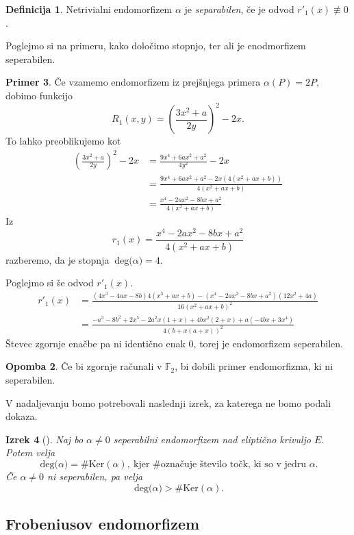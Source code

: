 \documentclass[12pt,a4paper,twoside]{article}
\theoremstyle{definition} %
\newtheorem{definicija}{Definicija}[section]
\newtheorem{primer}[definicija]{Primer}
\newtheorem{opomba}[definicija]{Opomba}
\theoremstyle{plain} %
\newtheorem{izrek}[definicija]{Izrek}
\numberwithin{equation}{section}  %
\newcommand{\F}{\mathbb F}
\newcommand{\DEG}[1]{\ \text{deg(}{#1}\text{)}}
\begin{document}
\begin{definicija}
Netrivialni endomorfizem $\alpha$ je \emph{separabilen}, če je odvod $r'_1(x) \not \equiv 0$.
\end{definicija}

Poglejmo si na primeru, kako določimo stopnjo, ter ali je enodmorfizem seperabilen.

\begin{primer}
Če vzamemo endomorfizem iz prejšnjega primera $\alpha(P) = 2P,$ dobimo funkcijo
$$R_1(x,y) = \left(\frac{3x^2+a}{2y}\right)^2-2x.$$
To lahko preoblikujemo kot
\begin{align}
\left(\frac{3x^2+a}{2y}\right)^2-2x &{}= \frac{9x^4+6ax^2+a^2}{4y^2}-2x \nonumber \\
&{} = \frac{9x^4+6ax^2+a^2 - 2x(4(x^2+ax+b))}{4(x^2+ax+b)} \nonumber \\
&{} = \frac{x^4-2ax^2-8bx+a^2}{4(x^2+ax+b)} \nonumber
\end{align}
Iz
$$r_1(x) = \frac{x^4-2ax^2-8bx+a^2}{4(x^2+ax+b)}$$
razberemo, da je stopnja $\DEG{\alpha} = 4$.

Poglejmo si še odvod $r'_1(x)$.
\begin{align}
r'_1(x) &{}=\frac{(4x^3-4ax-8b)4(x^3+ax+b)-(x^4-2ax^2-8bx+a^2)(12x^2+4a)}{16(x^2+ax+b)^2} \nonumber \\
&{} = \frac{-a^3 - 8 b^2 + 2 x^5 - 2 a^2 x (1 + x) + 4 b x^2 (2 + x) +  a (-4 b x + 3 x^4)}{4 (b + x (a + x))^2} \nonumber
\end{align}
Števec zgornje enačbe pa ni identično enak $0$, torej je endomorfizem seperabilen.
\begin{opomba}
Če bi zgornje računali v $\F_2$, bi dobili primer endomorfizma, ki ni seperabilen.
\end{opomba}
\end{primer}

V nadaljevanju bomo potrebovali naslednji izrek, za katerega ne bomo podali dokaza.

\begin{izrek}[]
\label{izrek:2.21}
Naj bo $\alpha \neq 0$ seperabilni endomorfizem nad eliptično krivuljo $E$. Potem velja
$$\DEG{\alpha}= \# \text{Ker}(\alpha), \ \text{kjer \# označuje število točk, ki so v jedru } \alpha.$$
Če $\alpha \neq 0$ ni seperabilen, pa velja
$$\DEG{\alpha} > \# \text{Ker}(\alpha).$$
\end{izrek}

\subsection{Frobeniusov endomorfizem}
\end{document}
